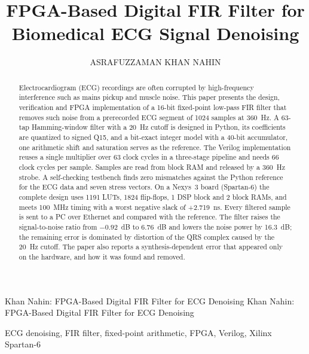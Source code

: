 \documentclass{ieeeaccess}
\newcommand{\resLUT}{1191}
\newcommand{\resFF}{1824}
\newcommand{\resDSP}{1}
\newcommand{\resBRAM}{2}
\newcommand{\resWNS}{+2.719}
\begin{document}

\title{FPGA-Based Digital FIR Filter for Biomedical ECG Signal Denoising}
\author{\uppercase{Asrafuzzaman Khan Nahin}}
\address[1]{Department of Electrical Engineering, King Fahd University of Petroleum and Minerals, Dhahran 31261, Saudi Arabia (e-mail: g202318990@kfupm.edu.sa)}

\markboth
{Khan Nahin: FPGA-Based Digital FIR Filter for ECG Denoising}
{Khan Nahin: FPGA-Based Digital FIR Filter for ECG Denoising}


\begin{abstract}
Electrocardiogram (ECG) recordings are often corrupted by high-frequency interference such as mains pickup and muscle noise. This paper presents the design, verification and FPGA implementation of a 16-bit fixed-point low-pass FIR filter that removes such noise from a prerecorded ECG segment of 1024 samples at 360~Hz. A 63-tap Hamming-window filter with a 20~Hz cutoff is designed in Python, its coefficients are quantized to signed Q15, and a bit-exact integer model with a 40-bit accumulator, one arithmetic shift and saturation serves as the reference. The Verilog implementation reuses a single multiplier over 63 clock cycles in a three-stage pipeline and needs 66 clock cycles per sample. Samples are read from block RAM and released by a 360~Hz strobe. A self-checking testbench finds zero mismatches against the Python reference for the ECG data and seven stress vectors. On a Nexys~3 board (Spartan-6) the complete design uses \resLUT{} LUTs, \resFF{} flip-flops, \resDSP{} DSP block and \resBRAM{} block RAMs, and meets 100~MHz timing with a worst negative slack of \resWNS{}~ns. Every filtered sample is sent to a PC over Ethernet and compared with the reference. The filter raises the signal-to-noise ratio from $-0.92$~dB to $6.76$~dB and lowers the noise power by 16.3~dB; the remaining error is dominated by distortion of the QRS complex caused by the 20~Hz cutoff. The paper also reports a synthesis-dependent error that appeared only on the hardware, and how it was found and removed.
\end{abstract}

\begin{keywords}
ECG denoising, FIR filter, fixed-point arithmetic, FPGA, Verilog, Xilinx Spartan-6
\end{keywords}
\end{document}
